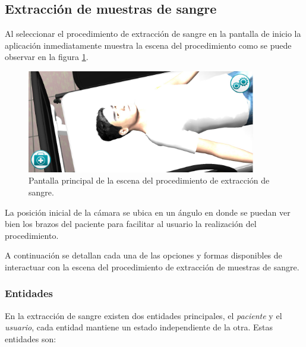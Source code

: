 \subsection{Extracción de muestras de sangre}


Al seleccionar el procedimiento de extracción de sangre en la pantalla de inicio 
la aplicación inmediatamente muestra la escena del procedimiento como se puede 
observar en la figura \ref{fig:hemocultivo_principal}. %

\begin{figure}[H] 
\centering 
\includegraphics[width=10cm]{solucion/images/hemocultivo_principal.jpg}
\caption{Pantalla principal de la escena del procedimiento de extracción de sangre.}
\label{fig:hemocultivo_principal}
\end{figure}

La posición inicial de la cámara se ubica en un ángulo en donde se puedan ver 
bien los brazos del paciente para facilitar al usuario la realización del 
procedimiento.

A continuación se detallan cada una de las opciones y formas disponibles de
interactuar con la escena del procedimiento de extracción de muestras de sangre.


\subsubsection{Entidades}

En la extracción de sangre existen dos entidades principales, el \emph{paciente}
y el \emph{usuario}, cada entidad mantiene un estado independiente de la otra.
Estas entidades son:

